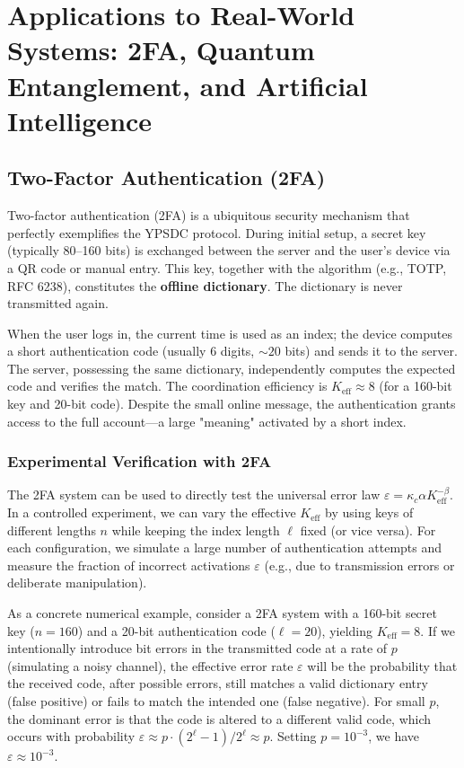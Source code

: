 \documentclass[12pt,a4paper]{article}
\theoremstyle{remark}
\newcommand{\Keff}{K_{\mathrm{eff}}}
\begin{document}
	\section{Applications to Real-World Systems: 2FA, Quantum Entanglement, and Artificial Intelligence}
	\label{sec:applications}
	
	\subsection{Two-Factor Authentication (2FA)}
	
	Two-factor authentication (2FA) is a ubiquitous security mechanism that perfectly exemplifies the YPSDC protocol. During initial setup, a secret key (typically 80--160 bits) is exchanged between the server and the user's device via a QR code or manual entry. This key, together with the algorithm (e.g., TOTP, RFC 6238), constitutes the \textbf{offline dictionary}. The dictionary is never transmitted again.
	
	When the user logs in, the current time is used as an index; the device computes a short authentication code (usually 6 digits, $\sim 20$ bits) and sends it to the server. The server, possessing the same dictionary, independently computes the expected code and verifies the match. The coordination efficiency is $\Keff \approx 8$ (for a 160-bit key and 20-bit code). Despite the small online message, the authentication grants access to the full account---a large "meaning" activated by a short index.
	
	\subsubsection{Experimental Verification with 2FA}
	\label{subsec:2fa-experiment}
	
	The 2FA system can be used to directly test the universal error law $\varepsilon = \kappa_c \alpha K_{\mathrm{eff}}^{-\beta}$. In a controlled experiment, we can vary the effective $\Keff$ by using keys of different lengths $n$ while keeping the index length $\ell$ fixed (or vice versa). For each configuration, we simulate a large number of authentication attempts and measure the fraction of incorrect activations $\varepsilon$ (e.g., due to transmission errors or deliberate manipulation).
	
	As a concrete numerical example, consider a 2FA system with a 160-bit secret key ($n=160$) and a 20-bit authentication code ($\ell=20$), yielding $\Keff = 8$. If we intentionally introduce bit errors in the transmitted code at a rate of $p$ (simulating a noisy channel), the effective error rate $\varepsilon$ will be the probability that the received code, after possible errors, still matches a valid dictionary entry (false positive) or fails to match the intended one (false negative). For small $p$, the dominant error is that the code is altered to a different valid code, which occurs with probability $\varepsilon \approx p \cdot (2^\ell -1)/2^\ell \approx p$. Setting $p = 10^{-3}$, we have $\varepsilon \approx 10^{-3}$.
	
\end{document}
